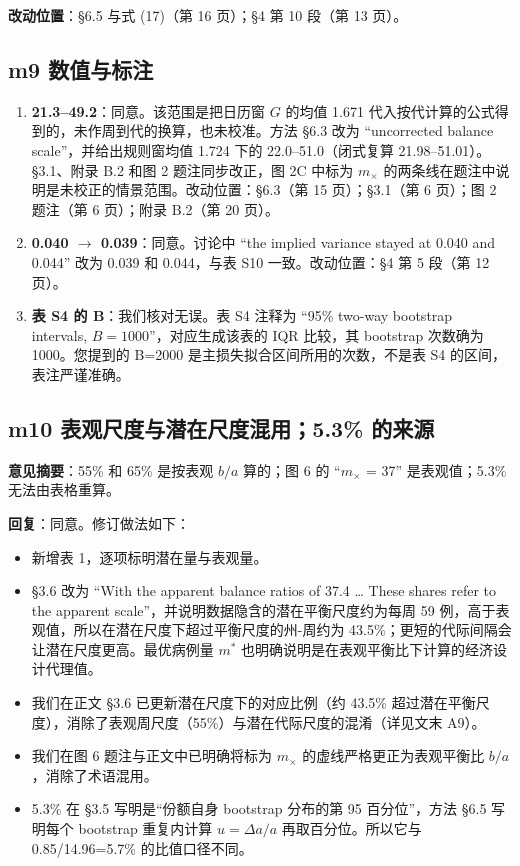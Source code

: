 \documentclass[UTF8,a4paper,11pt,fontset=none]{ctexart}
\providecommand{\tightlist}{\setlength{\itemsep}{1pt}\setlength{\parskip}{0pt}}
\begin{document}
\textbf{改动位置}：§6.5 与式 (17)（第 16 页）；§4 第 10 段（第 13 页）。

\subsection*{m9 数值与标注}

\begin{enumerate}
\def\labelenumi{\arabic{enumi}.}
\tightlist
\item
  \textbf{21.3--49.2}：同意。该范围是把日历窗 \(G\) 的均值 1.671 代入按代计算的公式得到的，未作周到代的换算，也未校准。方法 §6.3 改为 ``uncorrected balance scale''，并给出规则窗均值 1.724 下的 22.0--51.0（闭式复算 21.98--51.01）。§3.1、附录 B.2 和图 2 题注同步改正，图 2C 中标为 \(m_\times\) 的两条线在题注中说明是未校正的情景范围。改动位置：§6.3（第 15 页）；§3.1（第 6 页）；图 2 题注（第 6 页）；附录 B.2（第 20 页）。
\item
  \textbf{0.040 \(\rightarrow\) 0.039}：同意。讨论中 ``the implied variance stayed at 0.040 and 0.044'' 改为 0.039 和 0.044，与表 S10 一致。改动位置：§4 第 5 段（第 12 页）。
\item
  \textbf{表 S4 的 B}：我们核对无误。表 S4 注释为 ``95\% two-way bootstrap intervals, \(B=1000\)''，对应生成该表的 IQR 比较，其 bootstrap 次数确为 1000。您提到的 B=2000 是主损失拟合区间所用的次数，不是表 S4 的区间，表注严谨准确。
\end{enumerate}

\subsection*{m10 表观尺度与潜在尺度混用；5.3\% 的来源}

\textbf{意见摘要}：55\% 和 65\% 是按表观 \(b/a\) 算的；图 6 的 ``\(m_\times\) = 37'' 是表观值；5.3\% 无法由表格重算。

\textbf{回复}：同意。修订做法如下：

\begin{itemize}
\tightlist
\item
  新增表 1，逐项标明潜在量与表观量。
\item
  §3.6 改为 ``With the apparent balance ratios of 37.4 \ldots{} These shares refer to the apparent scale''，并说明数据隐含的潜在平衡尺度约为每周 59 例，高于表观值，所以在潜在尺度下超过平衡尺度的州-周约为 43.5\%；更短的代际间隔会让潜在尺度更高。最优病例量 \(m^*\) 也明确说明是在表观平衡比下计算的经济设计代理值。
\item
  我们在正文 §3.6 已更新潜在尺度下的对应比例（约 43.5\% 超过潜在平衡尺度），消除了表观周尺度（55\%）与潜在代际尺度的混淆（详见文末 A9）。
\item
  我们在图 6 题注与正文中已明确将标为 \(m_\times\) 的虚线严格更正为表观平衡比 \(b/a\)，消除了术语混用。
\item
  5.3\% 在 §3.5 写明是``份额自身 bootstrap 分布的第 95 百分位''，方法 §6.5 写明每个 bootstrap 重复内计算 \(u=\Delta a/a\) 再取百分位。所以它与 0.85/14.96=5.7\% 的比值口径不同。
\end{itemize}
\end{document}
